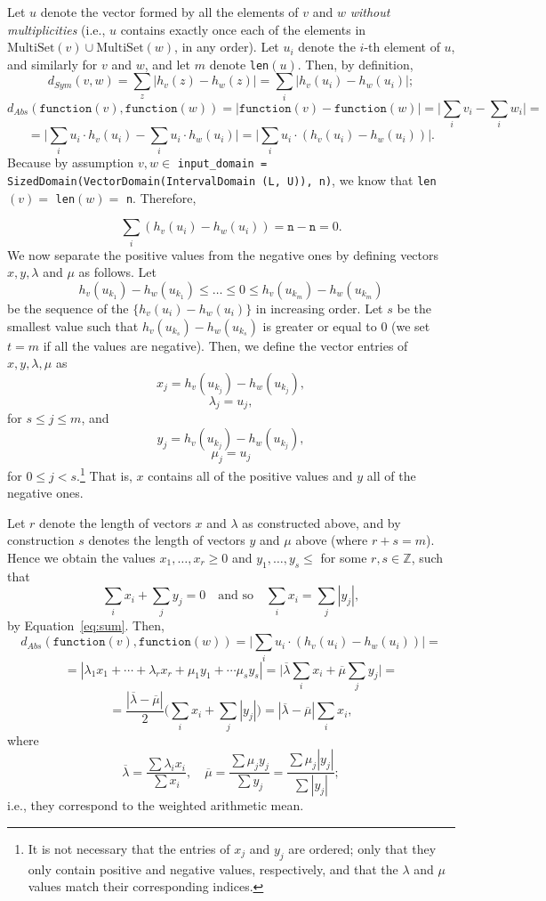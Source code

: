 \documentclass[11pt,a4paper]{article}
\theoremstyle{definition}
\newcommand{\MultiSet}{\mathrm{MultiSet}}
\newcommand{\function}{\texttt{function}}
\begin{document}
Let $u$ denote the vector formed by all the elements of $v$ and $w$ \textit{without multiplicities} (i.e., $u$ contains exactly once each of the elements in $\MultiSet(v) \cup \MultiSet(w)$, in any order). Let $u_i$ denote the $i$-th element of $u$, and similarly for $v$ and $w$, and let $m$ denote \texttt{len}$(u)$.  
Then, by definition,
\[
    d_{Sym}(v, w) = \sum_z \Big|h_v(z) - h_w(z)\Big| = \sum_i \Big|h_v(u_i) - h_w(u_i)\Big|;
\]
\[
    d_{Abs}(\function(v), \function(w)) = \Big|\function(v) - \function(w)\Big| = \Big|\sum_i v_i - \sum_i w_i\Big| = 
\]
\[
   = \Big|\sum_i u_i \cdot h_v(u_i) - \sum_i u_i \cdot h_w(u_i)\Big| = \Big|\sum_i u_i \cdot (h_v(u_i) - h_w(u_i))\Big|.
\]
Because by assumption $v, w \in $ \texttt{input\_domain = SizedDomain(VectorDomain(IntervalDomain (L, U)), n)}, we know that \texttt{len}$(v) =$ \texttt{len}$(w) =$ \texttt{n}. Therefore,

\begin{equation}\label{eq:sum}
    \sum_i (h_v(u_i) - h_w(u_i)) = \texttt{n}-\texttt{n} = 0.
\end{equation}
We now separate the positive values from the negative ones by defining vectors $x, y, \lambda$ and $\mu$ as follows. Let
\[
    h_v(u_{k_1})-h_w(u_{k_1}) \leq \ldots \leq 0 \leq h_v(u_{k_m})-h_w(u_{k_m}) 
\]
be the sequence of the $\{h_v(u_i)-h_w(u_{i})\}$ in increasing order. Let $s$ be the smallest value such that $h_v(u_{k_s})-h_w(u_{k_s})$ is greater or equal to 0 (we set $t=m$ if all the values are negative). Then, we define the vector entries of $x, y, \lambda, \mu$ as
\[
    x_j = h_v(u_{k_{j}})-h_w(u_{k_{j}}),
\]
\[
    \lambda_j = u_{j},
\]
for $s \leq j \leq m$, and
\[
    y_j = h_v(u_{k_{j}})-h_w(u_{k_{j}}),
\]
\[
    \mu_j = u_j
\]
for $0 \leq j < s$.\footnote{It is not necessary that the entries of $x_j$ and $y_j$ are ordered; only that they only contain positive and negative values, respectively, and that the $\lambda$ and $\mu$ values match their corresponding indices.} That is, $x$ contains all of the positive values and $y$ all of the negative ones.

Let $r$ denote the length of vectors $x$ and $\lambda$ as constructed above, and by construction $s$ denotes the length of vectors $y$ and $\mu$ above (where $r+s = m$). Hence we obtain the values $x_1, \ldots, x_r \geq 0$ and $y_1, \ldots, y_s \leq$ for some $r, s \in \mathbb{Z}$, such that
\[
    \sum_i x_i + \sum_j y_j = 0 \quad \textrm{and so} \quad \sum_i x_i = \sum_j |y_j|,
\]
by Equation~\ref{eq:sum}. Then,
\[
    d_{Abs}(\function(v), \function(w)) = \Big|\sum_i u_i \cdot (h_v(u_i) - h_w(u_i))\Big| =
\]
\[
    = |\lambda_1 x_1 + \cdots + \lambda_r x_r + \mu_1 y_1 + \cdots \mu_s y_s| = \Big|\overline{\lambda} \sum_i x_i + \overline{\mu} \sum_j y_j\Big| = 
\]
\[
    = \dfrac{|\overline{\lambda} - \overline{\mu}|}{2} \Big(\sum_i x_i + \sum_j |y_j|\Big) = |\overline{\lambda} - \overline{\mu}| \sum_i x_i,
\]  
where
\[
    \overline{\lambda} = \dfrac{\sum \lambda_i x_i}{\sum x_i}, \quad \overline{\mu} = \dfrac{\sum \mu_j y_j}{\sum y_j} = \dfrac{\sum \mu_j |y_j|}{\sum |y_j|};
\]
i.e., they correspond to the weighted arithmetic mean. 
\end{document}
